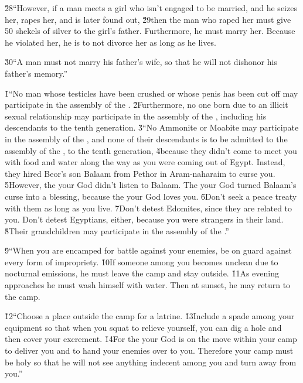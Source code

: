 \v{28}``However, if a man meets a girl who isn't engaged to be married, and he seizes her, rapes her, and is later found out, \v{29}then the man who raped her must give 50 shekels of silver to the girl's father. Furthermore, he must marry her. Because he violated her, he is to not divorce her as long as he lives.

\v{30}``A man must not marry his father's wife, so that he will not dishonor his father's memory.''

\v{1}``No man whose testicles have been crushed or whose penis has been cut off may participate in the assembly of the . \v{2}Furthermore, no one born due to an illicit sexual relationship may participate in the assembly of the , including his descendants to the tenth generation. \v{3}``No Ammonite or Moabite may participate in the assembly of the , and none of their descendants is to be admitted to the assembly of the , to the tenth generation, \v{4}because they didn't come to meet you with food and water along the way as you were coming out of Egypt. Instead, they hired Beor's son Balaam from Pethor in Aram-naharaim to curse you. \v{5}However, the  your God didn't listen to Balaam. The  your God turned Balaam's curse into a blessing, because the  your God loves you. \v{6}Don't seek a peace treaty with them as long as you live. \v{7}Don't detest Edomites, since they are related to you. Don't detest Egyptians, either, because you were strangers in their land. \v{8}Their grandchildren may participate in the assembly of the .''

\v{9}``When you are encamped for battle against your enemies, be on guard against every form of impropriety. \v{10}If someone among you becomes unclean due to nocturnal emissions, he must leave the camp and stay outside. \v{11}As evening approaches he must wash himself with water. Then at sunset, he may return to the camp.

\v{12}``Choose a place outside the camp for a latrine. \v{13}Include a spade among your equipment so that when you squat to relieve yourself, you can dig a hole and then cover your excrement. \v{14}For the  your God is on the move within your camp to deliver you and to hand your enemies over to you. Therefore your camp must be holy so that he will not see anything indecent among you and turn away from you.''


